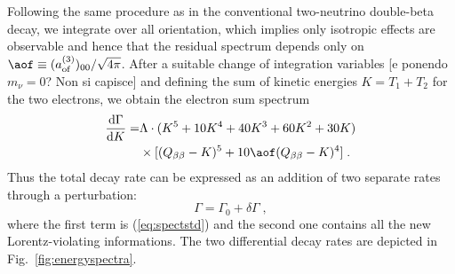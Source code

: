 Following the same procedure as in the conventional two-neutrino double-beta decay, we integrate over all orientation, which implies only isotropic effects are observable and hence that the residual spectrum depends only on $\aof\equiv(a_\text{of}^{(3)})_{00}/\sqrt{4\pi}$. After a suitable change of integration variables {\color{red}[e ponendo $m_\nu=0$? Non si capisce]} and defining the sum of kinetic energies $K=T_1+T_2$ for the two electrons, we obtain the electron sum spectrum
\begin{equation}
	\begin{split}
	\frac{\text{d}\Gamma}{\text{d}K} =& \Lambda \cdot(K^5+10K^4+40K^3+60K^2+30K) \\
									  & \times[(Q_{\beta\beta}-K)^5+10\aof(Q_{\beta\beta}-K)^4]\;. \\
	\end{split}\label{eq:totwidth}
\end{equation}
Thus the total decay rate can be expressed as an addition of two separate rates through a perturbation:
\[\Gamma=\Gamma_0+\delta\Gamma\;,\]
where the first term is (\ref{eq:spectstd}) and the second one contains all the new Lorentz-violating informations. The two differential decay rates are depicted in Fig.~\ref{fig:energyspectra}.
